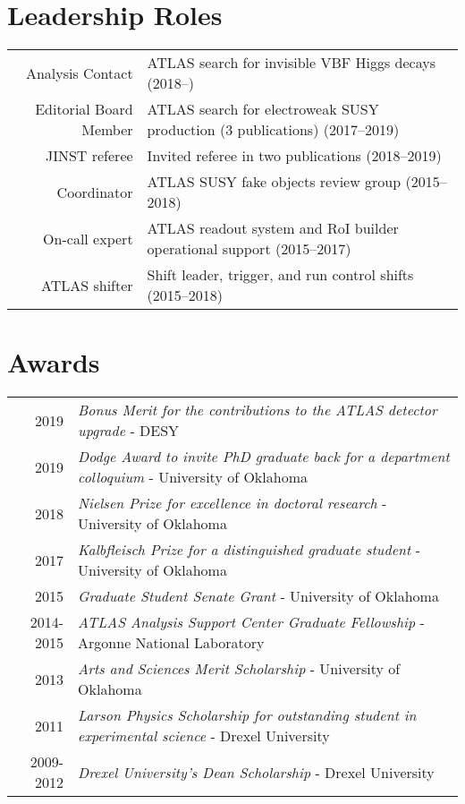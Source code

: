 \documentclass[a4paper,10pt]{article}
\begin{document}
\vspace{3mm}
\section{Leadership Roles}
\begin{tabular}{r | p{12cm}}
\multicolumn{1}{r|}{Analysis Contact}     & ATLAS search for invisible VBF Higgs decays  \hfill (2018--\phantom{0000}) \\
\multicolumn{1}{r|}{Editorial Board Member}   & ATLAS search for electroweak SUSY production (3 publications)  \hfill (2017--2019)\\
\multicolumn{1}{r|}{JINST referee}            & Invited referee in two publications \hfill (2018--2019) \\
\multicolumn{1}{r|}{Coordinator}              & ATLAS SUSY fake objects review group  \hfill (2015--2018)         \\
\multicolumn{1}{r|}{On-call expert}              & ATLAS readout system and RoI builder operational support \hfill (2015--2017)         \\
\multicolumn{1}{r|}{ATLAS shifter}           & Shift leader, trigger, and run control shifts  \hfill (2015--2018)         \\
\end{tabular}

\vspace{3mm}
\section{Awards}

\begin{tabular}{rp{15.5cm}}
\textsc{2019}       & {\em Bonus Merit for the contributions to the ATLAS detector upgrade} - DESY\\
\textsc{2019}       & {\em Dodge Award to invite PhD graduate back for a department colloquium} - University of Oklahoma\\
\textsc{2018}       & {\em Nielsen Prize for excellence in doctoral research} - University of Oklahoma\\
\textsc{2017}       & {\em Kalbfleisch Prize for a distinguished graduate student} - University of Oklahoma\\
\textsc{2015}       & {\em Graduate Student Senate Grant} - University of Oklahoma\\
\textsc{2014-2015}    & {\em ATLAS Analysis Support Center Graduate Fellowship} - Argonne National Laboratory\\
\textsc{2013}       & {\em Arts and Sciences Merit Scholarship} - University of Oklahoma\\
\textsc{2011}       & {\em Larson Physics Scholarship for outstanding student in experimental science} - Drexel University\\
\textsc{2009-2012}    & {\em Drexel University's Dean Scholarship} - Drexel University\\
\end{tabular}
\end{document}
